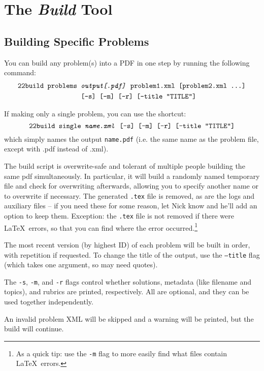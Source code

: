 \section{The \textit{Build} Tool}
  \subsection{Building Specific Problems}
    You can build any problem(s) into a PDF in one step by running the 
    following command:
    \begin{align*}\texttt{22build }\texttt{problems }&\texttt{\textit{output[.pdf]} problem1.xml [problem2.xml \dots]}\\
        ~&\texttt{[-s] [-m] [-r] [--title ``TITLE'']}\end{align*}
        
    If making only a single problem, you can use the shortcut:
    \[\texttt{22build }\texttt{single \textit{name.xml} [-s] [-m] [-r] [--title ``TITLE'']}\]
    which simply names the output \texttt{name.pdf} (i.e. the same name as 
    the problem file, except with .pdf instead of .xml).
    
    The build script is overwrite-safe and tolerant of multiple people 
    building the same pdf simultaneously. In particular, it will build a 
    randomly named temporary file and check for overwriting afterwards, 
    allowing you to specify another name or to overwrite if necessary. The 
    generated \texttt{.tex} file is removed, as are the logs and auxiliary 
    files -- if you need these for some reason, let Nick know and he'll 
    add an option to keep them. Exception: the \texttt{.tex} file is not 
    removed if there were \LaTeX\ errors, so that you can find where the 
    error occurred.\footnote{As a quick tip: use the \texttt{-m} flag to 
    more easily find what files contain \LaTeX\ errors.}
    
    The most recent version (by highest ID) of each problem will be built 
    in order, with repetition if requested. To change the 
    title of the output, use the \texttt{--title} flag (which takes one 
    argument, so may need quotes).
    
    The \texttt{-s}, \texttt{-m}, and \texttt{-r} flags control whether 
    solutions, metadata (like filename and topics), and rubrics are 
    printed, respectively. All are optional, and they can be used together 
    independently.
    
    An invalid problem XML will be skipped and a warning will be printed, 
    but the build will continue.
